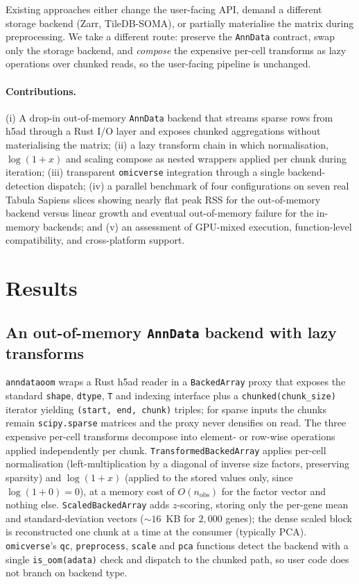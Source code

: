 \documentclass[11pt]{article}
\begin{document}
Existing approaches either change the user-facing API, demand a different
storage backend (Zarr, TileDB-SOMA), or partially materialise the matrix
during preprocessing. We take a different route: preserve the
\texttt{AnnData} contract, swap only the storage backend, and \emph{compose}
the expensive per-cell transforms as lazy operations over chunked reads, so
the user-facing pipeline is unchanged.

\paragraph{Contributions.} (i) A drop-in out-of-memory \texttt{AnnData}
backend that streams sparse rows from h5ad through a Rust I/O layer and
exposes chunked aggregations without materialising the matrix; (ii) a lazy
transform chain in which normalisation, $\log(1{+}x)$ and scaling compose as
nested wrappers applied per chunk during iteration; (iii) transparent
\texttt{omicverse} integration through a single backend-detection dispatch;
(iv) a parallel benchmark of four configurations on seven real Tabula
Sapiens slices showing nearly flat peak RSS for the out-of-memory backend
versus linear growth and eventual out-of-memory failure for the in-memory
backends; and (v) an assessment of GPU-mixed execution, function-level
compatibility, and cross-platform support.

\section{Results}

\subsection{An out-of-memory \texttt{AnnData} backend with lazy transforms}

\texttt{anndataoom} wraps a Rust h5ad reader\cite{anndataoom} in a
\texttt{BackedArray} proxy that exposes the standard \texttt{shape},
\texttt{dtype}, \texttt{T} and indexing interface plus a
\texttt{chunked(chunk\_size)} iterator yielding \texttt{(start, end, chunk)}
triples; for sparse inputs the chunks remain \texttt{scipy.sparse} matrices
and the proxy never densifies on read. The three expensive per-cell
transforms decompose into element- or row-wise operations applied
independently per chunk. \texttt{TransformedBackedArray} applies per-cell
normalisation (left-multiplication by a diagonal of inverse size factors,
preserving sparsity) and $\log(1{+}x)$ (applied to the stored values only,
since $\log(1{+}0)=0$), at a memory cost of $O(n_\mathrm{obs})$ for the
factor vector and nothing else. \texttt{ScaledBackedArray} adds $z$-scoring,
storing only the per-gene mean and standard-deviation vectors
($\sim$$16$~KB for $2{,}000$ genes); the dense scaled block is reconstructed
one chunk at a time at the consumer (typically PCA). \texttt{omicverse}'s
\texttt{qc}, \texttt{preprocess}, \texttt{scale} and \texttt{pca} functions
detect the backend with a single \texttt{is\_oom(adata)} check and dispatch
to the chunked path, so user code does not branch on backend type.
\end{document}

